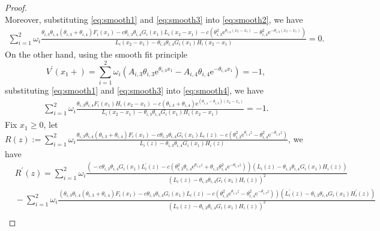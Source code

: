 \documentclass[11pt,reqno]{article}%
\numberwithin{equation}{section}
\begin{document}
\begin{proof}
\begin{equation}
\end{equation}
Moreover, substituting \eqref{eq:smooth1} and \eqref{eq:smooth3} into \eqref{eq:smooth2}, we have 
\begin{equation}\label{eq:existence1}\begin{aligned}
\sum\limits_{i=1}^{2}\omega_i\frac{\theta_{i,3}\theta_{i,4}(\theta_{i,3}+\theta_{i,4})F_i(x_1)-c\theta_{i,3}\theta_{i,4}G_i(x_1)L_i(x_2-x_1)-c\left(\theta_{i,3}^2\mathrm{e}^{\theta_{i,4}(x_2-x_1)}-\theta_{i,4}^2\mathrm{e}^{-\theta_{i,3}(x_2-x_1)}\right)}{L_i(x_2-x_1)-\theta_{i,3}\theta_{i,4}G_i(x_1)H_i(x_2-x_1)}=0.
\end{aligned}\end{equation}
On the other hand, using the smooth fit principle
\begin{equation}\label{eq:smooth4}
V^{\prime}(x_1+)=\sum\limits_{i=1}^{2}\omega_i \left(A_{i,3} \theta_{i,3} \mathrm{e}^{\theta_{i,3}x_1} - A_{i,4} \theta_{i,4} \mathrm{e}^{-\theta_{i,4}x_1}\right)=-1,
\end{equation}
substituting \eqref{eq:smooth1} and \eqref{eq:smooth3} into \eqref{eq:smooth4}, we have 
\begin{equation}\begin{aligned}\label{eq:existence2}
\sum\limits_{i=1}^{2}\omega_i\frac{\theta_{i,3}\theta_{i,4}F_i(x_1)H_i(x_2-x_1)-c(\theta_{i,3}+\theta_{i,4})\mathrm{e}^{(\theta_{i,4}-\theta_{i,3})(x_2-x_1)}}{L_i(x_2-x_1)-\theta_{i,3}\theta_{i,4}G_i(x_1)H_i(x_2-x_1)}=-1.
\end{aligned}\end{equation}
Fix $x_1\ge0$, let $R(z):=\sum\limits_{i=1}^{2}\omega_i\frac{\theta_{i,3}\theta_{i,4}(\theta_{i,3}+\theta_{i,4})F_i(x_1)-c\theta_{i,3}\theta_{i,4}G_i(x_1)L_i(z)-c\left(\theta_{i,3}^2\mathrm{e}^{\theta_{i,4}z}-\theta_{i,4}^2\mathrm{e}^{-\theta_{i,3}z}\right)}{L_i(z)-\theta_{i,3}\theta_{i,4}G_i(x_1)H_i(z)}$, we have
\begin{equation}\begin{aligned}\nonumber
&R^{\prime}(z)=\sum\limits_{i=1}^{2}\omega_i\frac{\left(\!-\!c\theta_{i,3}\theta_{i,4}G_i(x_1)L_i^{\prime}(z)\!-\!c\left(\theta_{i,3}^2\theta_{i,4}\mathrm{e}^{\theta_{i,4}z}\!+\!\theta_{i,3}\theta_{i,4}^2\mathrm{e}^{-\theta_{i,3}z}\right)\right)\left(L_i(z)\!-\!\theta_{i,3}\theta_{i,4}G_i(x_1)H_i(z)\right)}{\left(L_i(z)\!-\!\theta_{i,3}\theta_{i,4}G_i(x_1)H_i(z)\right)^2}\\
&\!-\!\sum\limits_{i=1}^{2}\omega_i\frac{\left(\theta_{i,3}\theta_{i,4}(\theta_{i,3}\!+\!\theta_{i,4})F_i(x_1)\!-\!c\theta_{i,3}\theta_{i,4}G_i(x_1)L_i(z)\!-\!c\left(\theta_{i,3}^2\mathrm{e}^{\theta_{i,4}z}\!-\!\theta_{i,4}^2\mathrm{e}^{-\theta_{i,3}z}\right)\right)\left(L_i^{\prime}(z)\!-\!\theta_{i,3}\theta_{i,4}G_i(x_1)H_i^{\prime}(z)\right)}{\left(L_i(z)\!-\!\theta_{i,3}\theta_{i,4}G_i(x_1)H_i(z)\right)^2}\\

\end{aligned}
\end{equation}
\end{proof}
\end{document}
